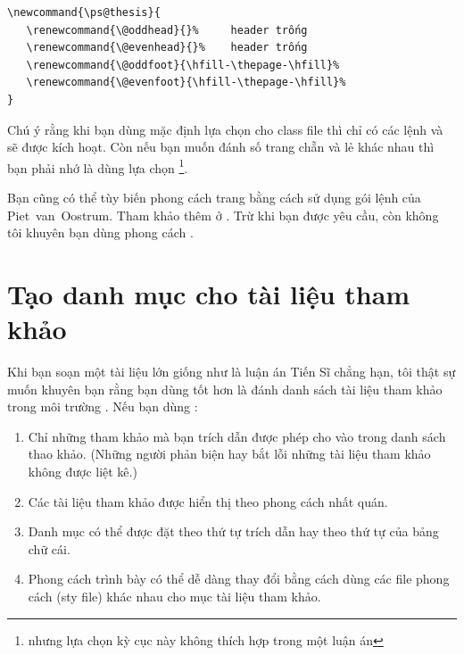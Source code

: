 \documentclass[a4paper]{report}
\begin{document}
\begin{verbatim}
\newcommand{\ps@thesis}{
   \renewcommand{\@oddhead}{}%     header trống
   \renewcommand{\@evenhead}{}%    header trống
   \renewcommand{\@oddfoot}{\hfill-\thepage-\hfill}%     
   \renewcommand{\@evenfoot}{\hfill-\thepage-\hfill}%     
}
\end{verbatim}

\noindent Chú ý rằng khi bạn dùng mặc định lựa chọn  cho class file  thì chỉ  có các lệnh  và  sẽ được kích hoạt. Còn nếu bạn muốn đánh số trang chẵn và lẻ khác nhau thì bạn phải nhớ là dùng lựa chọn \footnote{nhưng lựa chọn kỳ cục này không thích hợp trong một luận án}.

\noindent Bạn cũng có thể tùy biến phong cách trang bằng cách sử dụng gói lệnh  của Piet~van~Oostrum. Tham khảo thêm ở \latexguide{}.
\noindent Trừ khi bạn được yêu cầu, còn không tôi khuyên bạn dùng  phong cách .




\chapter{Tạo danh mục cho tài liệu tham khảo}

Khi bạn soạn một tài liệu lớn giống như là luận án Tiến Sĩ chẳng hạn, tôi thật sự muốn khuyên bạn rằng bạn dùng \BiBTeX{} tốt hơn là đánh danh sách tài liệu tham khảo trong môi trường . Nếu bạn dùng \BiBTeX{}:

\begin{enumerate}
\item Chỉ những tham khảo mà bạn trích dẫn được phép cho vào trong danh sách thao khảo.
(Những người phản biện hay bắt lỗi những tài liệu tham khảo không được liệt kê.)

\item Các tài liệu tham khảo được hiển thị theo phong cách nhất quán.

\item Danh mục có thể được đặt theo thứ tự trích dẫn hay theo thứ tự của bảng chữ cái.

\item Phong cách trình bày có thể dễ dàng thay đổi bằng cách dùng các file phong cách (sty file) khác nhau cho mục tài liệu tham khảo.

\end{enumerate}
\end{document}
